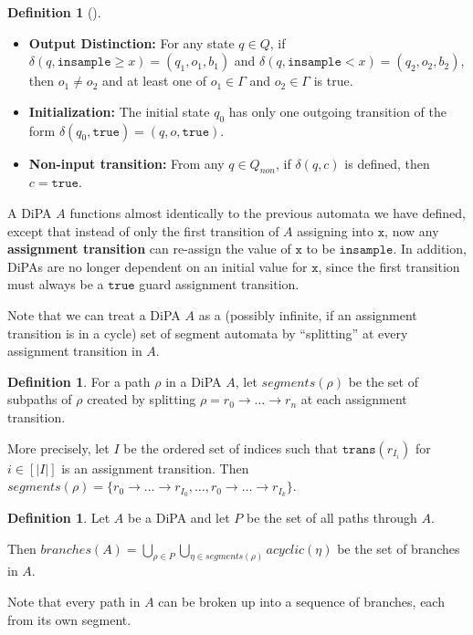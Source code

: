 \documentclass[12pt]{article}
\newcommand{\gguard}[1][x]{\texttt{insample}\geq #1}
\newcommand{\lguard}[1][x]{\texttt{insample} < #1}
\newcommand{\trans}{\texttt{trans}}
\theoremstyle{definition}
\newtheorem{defn}[thm]{Definition}
\begin{document}
\begin{defn}[\cite{chadhaLinearTimeDecidability2021}]
\begin{itemize}
        \item \textbf{Output Distinction:} For any state $q\in Q$, if $\delta(q, \gguard) = (q_1, o_1, b_1)$ and $\delta(q, \lguard) = (q_2, o_2, b_2)$, then $o_1\neq o_2$ and at least one of $o_1\in \Gamma$ and $o_2\in \Gamma$ is true.

        \item \textbf{Initialization:} The initial state $q_0$ has only one outgoing transition of the form $\delta(q_0, \texttt{true}) = (q, o, \texttt{true})$.

        \item \textbf{Non-input transition:} From any $q\in Q_{non}$, if $\delta(q, c)$ is defined, then $c=\texttt{true}$.
    \end{itemize}

    A DiPA $A$ functions almost identically to the previous automata we have defined, except that instead of only the first transition of $A$ assigning into $\texttt{x}$, now any \textbf{assignment transition} can re-assign the value of $\texttt{x}$ to be $\texttt{insample}$. In addition, DiPAs are no longer dependent on an initial value for $\texttt{x}$, since the first transition must always be a $\texttt{true}$ guard assignment transition.
\end{defn}

Note that we can treat a DiPA $A$ as a (possibly infinite, if an assignment transition is in a cycle) set of segment automata by ``splitting'' at every assignment transition in $A$. 


\begin{defn}
    For a path $\rho$ in a DiPA $A$, let $segments(\rho)$ be the set of subpaths of $\rho$ created by splitting $\rho=r_0\to\ldots\to r_n$ at each assignment transition. 
    
    More precisely, let $I$ be the ordered set of indices such that $\trans(r_{I_i})$ for $i\in [|I|]$ is an assignment transition. Then $segments(\rho) = \{r_0\to\ldots\to r_{I_0}, \ldots, r_0\to\ldots\to r_{I_k}\}$.
\end{defn}

\begin{defn}
    Let $A$ be a DiPA and let $P$ be the set of all paths through $A$. 
    
    Then $branches(A) = \bigcup_{\rho\in P}\bigcup_{\eta\in segments(\rho)} acyclic(\eta)$ be the set of branches in $A$.
\end{defn}

Note that every path in $A$ can be broken up into a sequence of branches, each from its own segment. 
\end{document}

